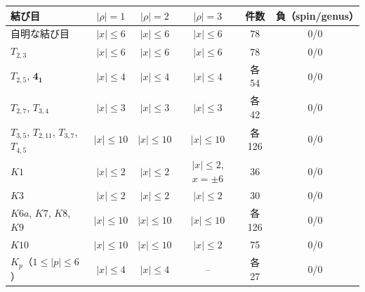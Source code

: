 \begin{tabular}{lccccc}
\hline
結び目 & $|\rho|=1$ & $|\rho|=2$ & $|\rho|=3$ & 件数 & 負（spin/genus） \\
\hline
自明な結び目 & $|x|\le6$ & $|x|\le6$ & $|x|\le6$ & 78 & 0/0 \\
$T_{2,3}$ & $|x|\le6$ & $|x|\le6$ & $|x|\le6$ & 78 & 0/0 \\
$T_{2,5}$, $\mathbf{4_1}$ & $|x|\le4$ & $|x|\le4$ & $|x|\le4$ & 各 54 & 0/0 \\
$T_{2,7}$, $T_{3,4}$ & $|x|\le3$ & $|x|\le3$ & $|x|\le3$ & 各 42 & 0/0 \\
$T_{3,5}$, $T_{2,11}$, $T_{3,7}$, $T_{4,5}$ & $|x|\le10$ & $|x|\le10$ & $|x|\le10$ & 各 126 & 0/0 \\
$K1$ & $|x|\le2$ & $|x|\le2$ & $|x|\le2$, $x=\pm6$ & 36 & 0/0 \\
$K3$ & $|x|\le2$ & $|x|\le2$ & $|x|\le2$ & 30 & 0/0 \\
$K6a$, $K7$, $K8$, $K9$ & $|x|\le10$ & $|x|\le10$ & $|x|\le10$ & 各 126 & 0/0 \\
$K10$ & $|x|\le10$ & $|x|\le10$ & $|x|\le2$ & 75 & 0/0 \\
$K_p$（$1\le|p|\le6$） & $|x|\le4$ & $|x|\le4$ & -- & 各 27 & 0/0 \\
\hline
\end{tabular}
